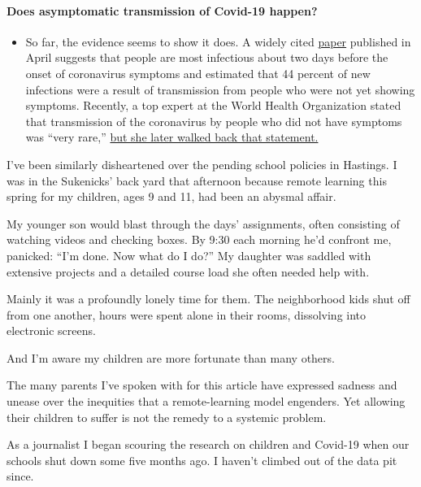 \begin{itemize}
{  \paragraph{Does asymptomatic transmission of Covid-19
  happen?}\label{does-asymptomatic-transmission-of-covid-19-happen}}

  \begin{itemize}
  \tightlist
  \item
    So far, the evidence seems to show it does. A widely cited
    \href{https://www.nature.com/articles/s41591-020-0869-5}{paper}
    published in April suggests that people are most infectious about
    two days before the onset of coronavirus symptoms and estimated that
    44 percent of new infections were a result of transmission from
    people who were not yet showing symptoms. Recently, a top expert at
    the World Health Organization stated that transmission of the
    coronavirus by people who did not have symptoms was ``very rare,''
    \href{https://www.nytimes.com/2020/06/09/world/coronavirus-updates.html?action=click\&pgtype=Article\&state=default\&region=MAIN_CONTENT_3\&context=storylines_faq\#link-1f302e21}{but
    she later walked back that statement.}
  \end{itemize}
\end{itemize}

I've been similarly disheartened over the pending school policies in
Hastings. I was in the Sukenicks' back yard that afternoon because
remote learning this spring for my children, ages 9 and 11, had been an
abysmal affair.

My younger son would blast through the days' assignments, often
consisting of watching videos and checking boxes. By 9:30 each morning
he'd confront me, panicked: ``I'm done. Now what do I do?'' My daughter
was saddled with extensive projects and a detailed course load she often
needed help with.

Mainly it was a profoundly lonely time for them. The neighborhood kids
shut off from one another, hours were spent alone in their rooms,
dissolving into electronic screens.

And I'm aware my children are more fortunate than many others.

The many parents I've spoken with for this article have expressed
sadness and unease over the inequities that a remote-learning model
engenders. Yet allowing their children to suffer is not the remedy to a
systemic problem.

As a journalist I began scouring the research on children and Covid-19
when our schools shut down some five months ago. I haven't climbed out
of the data pit since.

